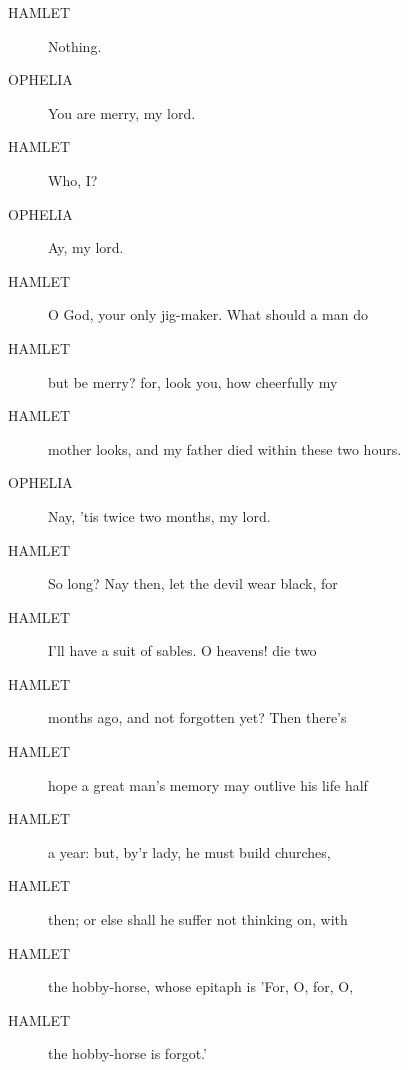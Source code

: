 \documentclass{article}
\begin{document}
\begin{description}
            
\item[HAMLET] Nothing.
\end{description}
          
\begin{description}
            
\item[OPHELIA] You are merry, my lord.
\end{description}
          
\begin{description}
            
\item[HAMLET] Who, I?
\end{description}
          
\begin{description}
            
\item[OPHELIA] Ay, my lord.
\end{description}
          
\begin{description}
            
\item[HAMLET] O God, your only jig-maker. What should a man do
\item[HAMLET] but be merry? for, look you, how cheerfully my
\item[HAMLET] mother looks, and my father died within these two hours.
\end{description}
          
\begin{description}
            
\item[OPHELIA] Nay, 'tis twice two months, my lord.
\end{description}
          
\begin{description}
            
\item[HAMLET] So long? Nay then, let the devil wear black, for
\item[HAMLET] I'll have a suit of sables. O heavens! die two
\item[HAMLET] months ago, and not forgotten yet? Then there's
\item[HAMLET] hope a great man's memory may outlive his life half
\item[HAMLET] a year: but, by'r lady, he must build churches,
\item[HAMLET] then; or else shall he suffer not thinking on, with
\item[HAMLET] the hobby-horse, whose epitaph is 'For, O, for, O,
\item[HAMLET] the hobby-horse is forgot.'
\end{description}
          
\end{document}

